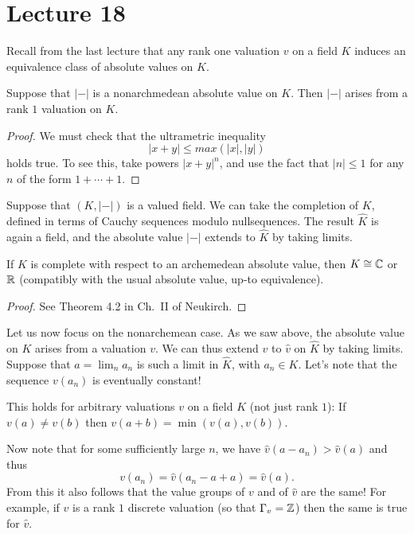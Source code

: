 \section{Lecture 18}

Recall from the last lecture that any rank one valuation $v$ on a field $K$ induces an equivalence class of absolute values on $K$.

\begin{theorem}
  Suppose that $|-|$ is a nonarchmedean absolute value on $K$.
  Then $|-|$ arises from a rank $1$ valuation on $K$.
\end{theorem}
\begin{proof}
  We must check that the ultrametric inequality
  \[ |x+y| \le max(|x|,|y|) \]
  holds true.
  To see this, take powers $|x+y|^{n}$, and use the fact that $|n| \le 1$ for any $n$ of the form $1 + \cdots + 1$.
\end{proof}

Suppose that $(K,|-|)$ is a valued field.
We can take the completion of $K$, defined in terms of Cauchy sequences modulo nullsequences.
The result $\hat K$ is again a field, and the absolute value $|-|$ extends to $\hat K$ by taking limits.

\begin{theorem}[Ostrowski]
  If $K$ is complete with respect to an archemedean absolute value, then $K \cong \mathbb{C}$ or $\mathbb{R}$ (compatibly with the usual absolute value, up-to equivalence).
\end{theorem}
\begin{proof}
  See Theorem 4.2 in Ch.~II of Neukirch.
\end{proof}

Let us now focus on the nonarchemean case.
As we saw above, the absolute value on $K$ arises from a valuation $v$.
We can thus extend $v$ to $\hat v$ on $\hat K$ by taking limits.
Suppose that $a = \lim_{n} a_{n}$ is such a limit in $\hat K$, with $a_{n} \in K$.
Let's note that the sequence $v(a_{n})$ is eventually constant!
\begin{exercise}
  This holds for arbitrary valuations $v$ on a field $K$ (not just rank $1$):
  If $v(a) \neq v(b)$ then $v(a+b) = \min(v(a),v(b))$.
\end{exercise}

Now note that for some sufficiently large $n$, we have $\hat v(a-a_{n}) > \hat v(a)$ and thus
\[ v(a_{n}) = \hat v(a_{n}-a+a) = \hat v(a). \]
From this it also follows that the value groups of $v$ and of $\hat v$ are the same!
For example, if $v$ is a rank $1$ discrete valuation (so that $\Gamma_{v} = \mathbb{Z}$) then the same is true for $\hat v$.

